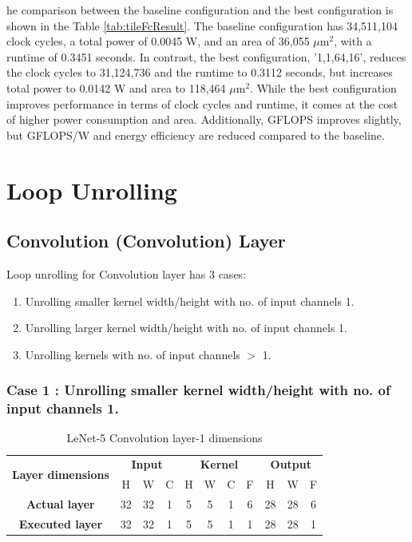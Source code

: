he comparison between the baseline configuration and the best configuration is shown in the Table \ref{tab:tileFcResult}. The baseline configuration has 34,511,104 clock cycles, a total power of 0.0045 W, and an area of 36,055 $\mu\text{m}^2$, with a runtime of 0.3451 seconds. In contrast, the best configuration, '1,1,64,16', reduces the clock cycles to 31,124,736 and the runtime to 0.3112 seconds, but increases total power to 0.0142 W and area to 118,464 $\mu\text{m}^2$. While the best configuration improves performance in terms of clock cycles and runtime, it comes at the cost of higher power consumption and area. Additionally, GFLOPS improves slightly, but GFLOPS/W and energy efficiency are reduced compared to the baseline.

\clearpage
\section{Loop Unrolling}
\subsection{Convolution (Convolution) Layer}

Loop unrolling for Convolution layer has 3 cases:
\begin{enumerate}
 \item Unrolling smaller kernel width/height with no. of input channels 1.
 \item Unrolling larger kernel width/height with no. of input channels 1.
 \item Unrolling kernels with no. of input channels $>$ 1.
\end{enumerate}

\subsubsection{Case 1 : Unrolling smaller kernel width/height with no. of input channels 1.}

\begin{table}[H]
\centering
\caption{LeNet-5 Convolution layer-1 dimensions}
\label{tab:unrollConvolutionCase1Dim}
 \begin{tabular}{|c|c|c|c|c|c|c|c|c|c|c|} \hline  
 
 \multirow{2}{*}{\textbf{Layer dimensions}} &  
 \multicolumn{3}{|c|}{\textbf{Input}} &  
 \multicolumn{4}{|c|}{\textbf{Kernel}} &  
 \multicolumn{3}{|c|}{\textbf{Output}}\\ \cline{2-11}
 & H &  W &  C&  H &  W &  C &  F &  H &  W & F\\ \hline  
 \textbf{Actual layer} &  32 &  32 &  1 & 5 & 5 & 1 & 6 & 28 & 28 & 6\\ \hline 
 \textbf{Executed layer} &  32 & 32 & 1 & 5 & 5 & 1 & \cellcolor{yellow}1 & 28 & 28 & \cellcolor{yellow}1 \\ \hline 
 \end{tabular}
\end{table}

